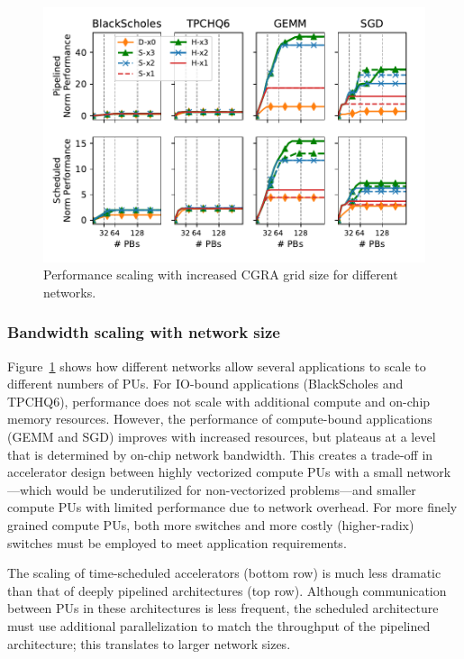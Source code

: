 \begin{figure}
\centering
\includegraphics[width=1\columnwidth]{network/figs/scale.pdf}
\caption{Performance scaling with increased CGRA grid size for different networks.}\label{fig:scale}
\end{figure}
\subsubsection{Bandwidth scaling with network size}\label{sec:scale}
Figure~\ref{fig:scale} shows how different networks allow several applications to scale to different numbers of PUs.
For IO-bound applications (BlackScholes and TPCHQ6), performance does not scale with additional compute and on-chip memory resources.
However, the performance of compute-bound applications (GEMM and SGD) improves with increased resources, but plateaus at a level that is determined by on-chip network bandwidth. 
This creates a trade-off in accelerator design between highly vectorized compute PUs with a small network---which would be underutilized for non-vectorized problems---and smaller compute PUs with limited performance due to network overhead. 
For more finely grained compute PUs, both more switches and more costly (higher-radix) switches must be employed to meet application requirements.

The scaling of time-scheduled accelerators (bottom row) is much less dramatic than that of deeply pipelined architectures (top row). 
Although communication between PUs in these architectures is less frequent, the scheduled architecture must use additional parallelization to match the throughput of the pipelined architecture; this translates to larger network sizes. 

